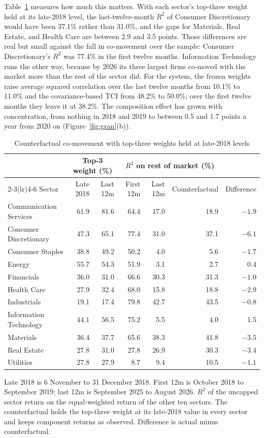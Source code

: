 \documentclass[11pt]{article}
\begin{document}
Table~\ref{tab:cf} measures how much this matters. With each sector's top-three weight held at its late-2018 level, the last-twelve-month $R^2$ of Consumer Discretionary would have been 37.1\% rather than 31.0\%, and the gaps for Materials, Real Estate, and Health Care are between 2.9 and 3.5 points. Those differences are real but small against the fall in co-movement over the sample: Consumer Discretionary's $R^2$ was 77.4\% in the first twelve months. Information Technology runs the other way, because by 2026 its three largest firms co-moved with the market more than the rest of the sector did. For the system, the frozen weights raise average squared correlation over the last twelve months from 10.1\% to 11.0\% and the covariance-based TCI from 48.2\% to 50.0\%; over the first twelve months they leave it at 38.2\%. The composition effect has grown with concentration, from nothing in 2018 and 2019 to between 0.5 and 1.7 points a year from 2020 on (Figure~\ref{fig:gran}(b)).

\begin{table}[H]
\centering
\caption{Counterfactual co-movement with top-three weights held at late-2018 levels}
\label{tab:cf}
\small
\begin{tabular}{lrrrrrr}
\toprule
& \multicolumn{2}{c}{Top-3 weight (\%)} & \multicolumn{3}{c}{$R^2$ on rest of market (\%)} & \\
\cmidrule(lr){2-3}\cmidrule(lr){4-6}
Sector & Late 2018 & Last 12m & First 12m & Last 12m & Counterfactual & Difference \\
\midrule
Communication Services & 61.9 & 81.6 & 64.4 & 17.0 & 18.9 & $-1.9$ \\
Consumer Discretionary & 47.3 & 65.1 & 77.4 & 31.0 & 37.1 & $-6.1$ \\
Consumer Staples & 38.8 & 49.2 & 50.2 & 4.0 & 5.6 & $-1.7$ \\
Energy & 55.7 & 54.3 & 51.9 & 3.1 & 2.7 & 0.4 \\
Financials & 36.0 & 31.0 & 66.6 & 30.3 & 31.3 & $-1.0$ \\
Health Care & 27.9 & 32.4 & 68.0 & 15.8 & 18.8 & $-2.9$ \\
Industrials & 19.1 & 17.4 & 79.8 & 42.7 & 43.5 & $-0.8$ \\
Information Technology & 44.1 & 56.5 & 75.2 & 5.5 & 4.0 & 1.5 \\
Materials & 36.4 & 37.7 & 65.6 & 38.3 & 41.8 & $-3.5$ \\
Real Estate & 27.8 & 31.0 & 27.8 & 26.9 & 30.3 & $-3.4$ \\
Utilities & 27.8 & 27.9 & 8.7 & 9.4 & 10.5 & $-1.1$ \\
\bottomrule
\end{tabular}

\smallskip
\parbox{0.95\textwidth}{\footnotesize Late 2018 is 6 November to 31 December 2018. First 12m is October 2018 to September 2019; last 12m is September 2025 to August 2026. $R^2$ of the uncapped sector return on the equal-weighted return of the other ten sectors. The counterfactual holds the top-three weight at its late-2018 value in every sector and keeps component returns as observed. Difference is actual minus counterfactual.}
\end{table}
\end{document}
